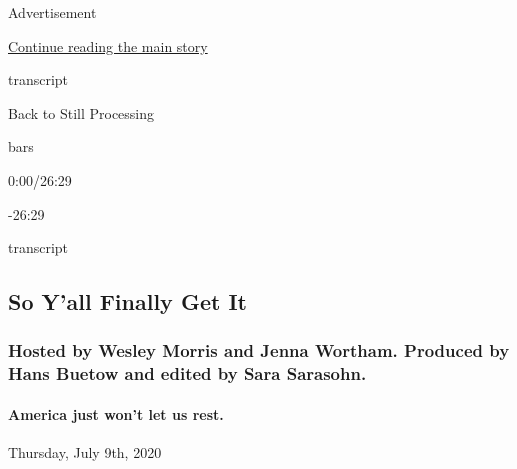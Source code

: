 Advertisement

\protect\hyperlink{after-top}{Continue reading the main story}

transcript

Back to Still Processing

bars

0:00/26:29

-26:29

transcript

\hypertarget{so-yall-finally-get-it}{%
\subsection{So Y'all Finally Get It}\label{so-yall-finally-get-it}}

\hypertarget{hosted-by-wesley-morris-and-jenna-wortham-produced-by-hans-buetow-and-edited-by-sara-sarasohn}{%
\subsubsection{Hosted by Wesley Morris and Jenna Wortham. Produced by
Hans Buetow and edited by Sara
Sarasohn.}\label{hosted-by-wesley-morris-and-jenna-wortham-produced-by-hans-buetow-and-edited-by-sara-sarasohn}}

\hypertarget{america-just-wont-let-us-rest}{%
\paragraph{America just won't let us
rest.}\label{america-just-wont-let-us-rest}}

Thursday, July 9th, 2020

